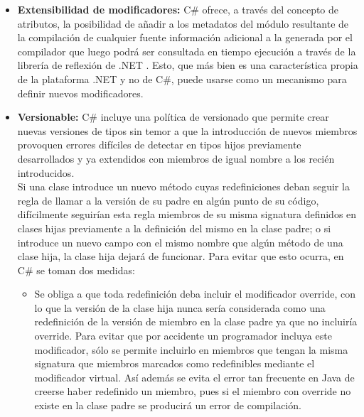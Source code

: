 \begin{itemize}
	Tambi\'en se da la posibilidad, a trav\'es del concepto de indizador, de redefinir el significado del operador [] para los tipos de dato definidos por el usuario, con lo que se consigue que se pueda acceder al mismo como si fuese una tabla. Esto es muy \'util para trabajar con tipos que act\'uen como colecciones de objetos. 

	\item \textbf{Extensibilidad de modificadores: } C\# ofrece, a trav\'es del concepto de atributos, la posibilidad de a\~nadir a los metadatos del m\'odulo resultante de la compilaci\'on de cualquier fuente informaci\'on adicional a la generada por el compilador que luego podr\'a ser consultada en tiempo ejecuci\'on a trav\'es de la librer\'ia de reflexi\'on de .NET . Esto, que m\'as bien es una caracter\'istica propia de la plataforma .NET y no de C\#, puede usarse como un mecanismo para definir nuevos modificadores. 

	\item \textbf{Versionable: } C\# incluye una pol\'itica de versionado que permite crear nuevas versiones de tipos sin temor a que la introducci\'on de nuevos miembros provoquen errores dif\'iciles de detectar en tipos hijos previamente desarrollados y ya extendidos con miembros de igual nombre a los reci\'en introducidos.\\

	Si una clase introduce un nuevo m\'etodo cuyas redefiniciones deban seguir la regla de llamar a la versi\'on de su padre en alg\'un punto de su c\'odigo, dif\'icilmente seguir\'ian esta regla miembros de su misma signatura definidos en clases hijas previamente a la definici\'on del mismo en la clase padre; o si introduce un nuevo campo con el mismo nombre que alg\'un m\'etodo de una clase hija, la clase hija dejar\'a de funcionar. Para evitar que esto ocurra, en C\# se toman dos medidas: 
	\begin{itemize}
		\item Se obliga a que toda redefinici\'on deba incluir el modificador override, con lo que la versi\'on de la clase hija nunca ser\'ia considerada como una redefinici\'on de la versi\'on de miembro en la clase padre ya que no incluir\'ia override. Para evitar que por accidente un programador incluya este modificador, s\'olo se permite incluirlo en miembros que tengan la misma signatura que miembros marcados como redefinibles mediante el modificador virtual. As\'i adem\'as se evita el error tan frecuente en Java de creerse haber redefinido un miembro, pues si el miembro con override no existe en la clase padre se producir\'a un error de compilaci\'on. 


\end{itemize}
\end{itemize}
